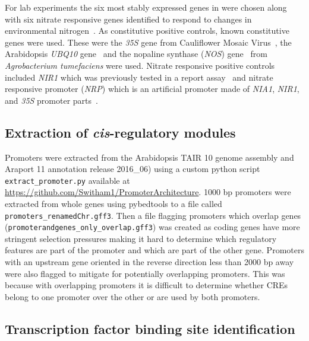 For lab experiments the six most stably expressed genes in \textcite*{czechowskiGenomeWideIdentificationTesting2005} were chosen along with six nitrate responsive
genes identified to respond to changes in environmental
nitrogen~\autocite{gaudinierTranscriptionalRegulationNitrogenassociated2018}. As constitutive positive controls, known constitutive genes were used. These were the \textit{35S} gene from Cauliflower Mosaic Virus~\autocite{holtorfComparisonDifferentConstitutive1995}, the
Arabidopsis \textit{UBQ10} gene~\autocite{grefenUbiquitin10PromoterbasedVector2010} and the nopaline synthase (\textit{NOS}) gene~\autocite{ebertIdentificationEssentialUpstream1987} from \textit{Agrobacterium tumefaciens} were used.
Nitrate responsive positive controls included \textit{NIR1} which was
previously tested in a report assay~\autocite{liuTargetedParallelSequencing2012} and nitrate
responsive promoter (\textit{NRP}) which is an artificial promoter made
of \textit{NIA1}, \textit{NIR1}, and \textit{35S} promoter
parts~\autocite{wangMultipleRegulatoryElements2010}.

\subsection{Extraction of \textit{cis}-regulatory modules}\label{extraction-of-cis-regulatory-modules}

Promoters were extracted from the Arabidopsis TAIR 10 \autocite{lameschArabidopsisInformationResource2012}
genome assembly and Araport 11 annotation \autocite{chengAraport11CompleteReannotation2017} release 2016\_06) using a custom python script \texttt{extract\_promoter.py} available at \url{https://github.com/Switham1/PromoterArchitecture}. 1000 bp promoters were extracted from whole genes using pybedtools \autocite{dalePybedtoolsFlexiblePython2011} to a file called \texttt{promoters\_renamedChr.gff3}. Then a file flagging promoters which overlap genes (\texttt{promoterandgenes\_only\_overlap.gff3})
was created as coding genes have more stringent selection pressures making it hard to determine which regulatory features are part of the promoter and which are part of the other gene.
Promoters with an upstream gene oriented in the reverse direction less than 2000 bp away were also flagged to mitigate for potentially overlapping promoters.
This was because with overlapping promoters it is difficult to determine whether CREs belong to one promoter over the other or are used by both promoters.

\subsection{Transcription factor binding site identification}
\label{transcription-factor-binding-site-identification}

